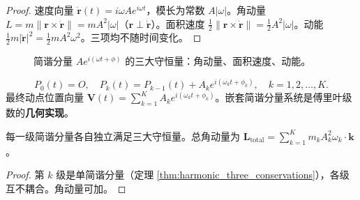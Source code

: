 \begin{proof}
速度向量 $\dot{\mathbf{r}}(t) = i\omega A e^{i\omega t}$，模长为常数 $A|\omega|$。角动量 $L = m\|\mathbf{r} \times \dot{\mathbf{r}}\| = mA^2|\omega|$（$\mathbf{r} \perp \dot{\mathbf{r}}$）。面积速度 $\frac{1}{2}\|\mathbf{r}\times\dot{\mathbf{r}}\| = \frac12 A^2|\omega|$。动能 $\frac12 m|\dot{\mathbf{r}}|^2 = \frac12 mA^2\omega^2$。三项均不随时间变化。
\end{proof}

\begin{figure}[htbp]
\centering
{}
\caption{简谐分量 $Ae^{i(\omega t+\phi)}$ 的三大守恒量：角动量、面积速度、动能。}
\label{fig:harmonic_conservation}
\end{figure}

\begin{definition}[嵌套简谐分量系统]\label{def:nested_harmonic}
\[
P_0(t) = O, \quad P_k(t) = P_{k-1}(t) + A_k e^{i(\omega_k t + \phi_k)}, \quad k = 1, 2, \dots, K.
\]
最终动点位置向量 $\mathbf{V}(t) = \sum_{k=1}^{K} A_k e^{i(\omega_k t + \phi_k)}$。嵌套简谐分量系统是傅里叶级数的\textbf{几何实现}。
\end{definition}

\begin{theorem}[嵌套简谐分量系统的独立守恒量]\label{thm:nested_harmonic_conservation}
每一级简谐分量各自独立满足三大守恒量。总角动量为 $\mathbf{L}_{\text{total}} = \sum_{k=1}^{K} m_k A_k^2 \omega_k \cdot \mathbf{k}$。
\end{theorem}

\begin{proof}
第 $k$ 级是单简谐分量（定理 \ref{thm:harmonic_three_conservations}），各级互不耦合。角动量可加。
\end{proof}


